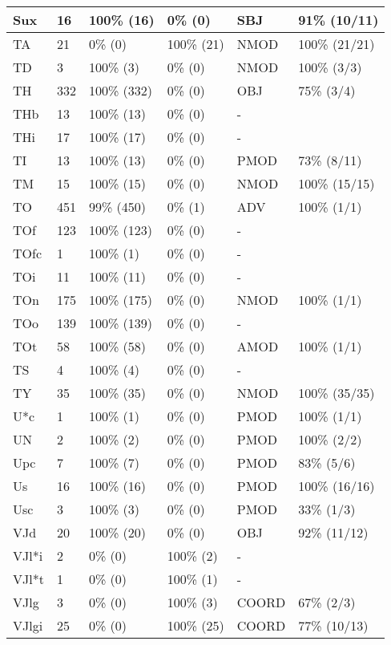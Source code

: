 \begin{figure*}
\begin{tabular}{|l|l|l|l||l|l|}
\hline
 Sux & 16 & 100\% (16) & 0\% (0) & SBJ & 91\% (10/11) \\ 
\hline
 TA & 21 & 0\% (0) & 100\% (21) & NMOD & 100\% (21/21) \\ 
\hline
 TD & 3 & 100\% (3) & 0\% (0) & NMOD & 100\% (3/3) \\ 
\hline
 TH & 332 & 100\% (332) & 0\% (0) & OBJ & 75\% (3/4) \\ 
\hline
 THb & 13 & 100\% (13) & 0\% (0) & - &  \\ 
\hline
 THi & 17 & 100\% (17) & 0\% (0) & - &  \\ 
\hline
 TI & 13 & 100\% (13) & 0\% (0) & PMOD & 73\% (8/11) \\ 
\hline
 TM & 15 & 100\% (15) & 0\% (0) & NMOD & 100\% (15/15) \\ 
\hline
 TO & 451 & 99\% (450) & 0\% (1) & ADV & 100\% (1/1) \\ 
\hline
 TOf & 123 & 100\% (123) & 0\% (0) & - &  \\ 
\hline
 TOfc & 1 & 100\% (1) & 0\% (0) & - &  \\ 
\hline
 TOi & 11 & 100\% (11) & 0\% (0) & - &  \\ 
\hline
 TOn & 175 & 100\% (175) & 0\% (0) & NMOD & 100\% (1/1) \\ 
\hline
 TOo & 139 & 100\% (139) & 0\% (0) & - &  \\ 
\hline
 TOt & 58 & 100\% (58) & 0\% (0) & AMOD & 100\% (1/1) \\ 
\hline
 TS & 4 & 100\% (4) & 0\% (0) & - &  \\ 
\hline
 TY & 35 & 100\% (35) & 0\% (0) & NMOD & 100\% (35/35) \\ 
\hline
 U*c & 1 & 100\% (1) & 0\% (0) & PMOD & 100\% (1/1) \\ 
\hline
 UN & 2 & 100\% (2) & 0\% (0) & PMOD & 100\% (2/2) \\ 
\hline
 Upc & 7 & 100\% (7) & 0\% (0) & PMOD & 83\% (5/6) \\ 
\hline
 Us & 16 & 100\% (16) & 0\% (0) & PMOD & 100\% (16/16) \\ 
\hline
 Usc & 3 & 100\% (3) & 0\% (0) & PMOD & 33\% (1/3) \\ 
\hline
 VJd & 20 & 100\% (20) & 0\% (0) & OBJ & 92\% (11/12) \\ 
\hline
 VJl*i & 2 & 0\% (0) & 100\% (2) & - &  \\ 
\hline
 VJl*t & 1 & 0\% (0) & 100\% (1) & - &  \\ 
\hline
 VJlg & 3 & 0\% (0) & 100\% (3) & COORD & 67\% (2/3) \\ 
\hline
 VJlgi & 25 & 0\% (0) & 100\% (25) & COORD & 77\% (10/13) \\ 
\hline
\end{tabular}
\end{figure*}
